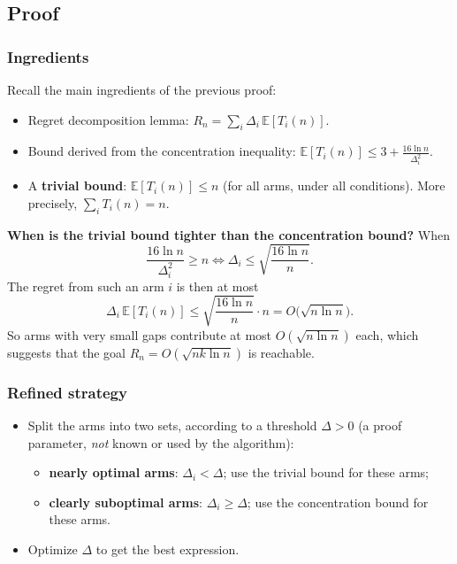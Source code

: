 \subsection{Proof}

\subsubsection*{Ingredients}

Recall the main ingredients of the previous proof:
\begin{itemize}
    \item Regret decomposition lemma: $R_n = \sum_i \Delta_i\,\mathbb{E}[T_i(n)]$.
    \item Bound derived from the concentration inequality: $\mathbb{E}[T_i(n)] \leq 3 + \frac{16\ln n}{\Delta_i^2}$.
    \item A \textbf{trivial bound}: $\mathbb{E}[T_i(n)] \leq n$ (for all arms, under all conditions). More precisely, $\sum_i T_i(n) = n$.
\end{itemize}

\textbf{When is the trivial bound tighter than the concentration bound?} When
\[
\frac{16\ln n}{\Delta_i^2} \geq n \iff \Delta_i \leq \sqrt{\frac{16\ln n}{n}}.
\]
The regret from such an arm $i$ is then at most
\[
\Delta_i\,\mathbb{E}[T_i(n)] \leq \sqrt{\frac{16\ln n}{n}} \cdot n = O\big(\sqrt{n\ln n}\big).
\]
So arms with very small gaps contribute at most $O(\sqrt{n \ln n})$ each, which suggests that the goal $R_n = O(\sqrt{nk\ln n})$ is reachable.

\subsubsection*{Refined strategy}

\begin{itemize}
    \item Split the arms into two sets, according to a threshold $\Delta > 0$ (a proof parameter, \emph{not} known or used by the algorithm):
    \begin{itemize}
        \item \textbf{nearly optimal arms}: $\Delta_i < \Delta$; use the trivial bound for these arms;
        \item \textbf{clearly suboptimal arms}: $\Delta_i \geq \Delta$; use the concentration bound for these arms.
    \end{itemize}
    \item Optimize $\Delta$ to get the best expression.
\end{itemize}

